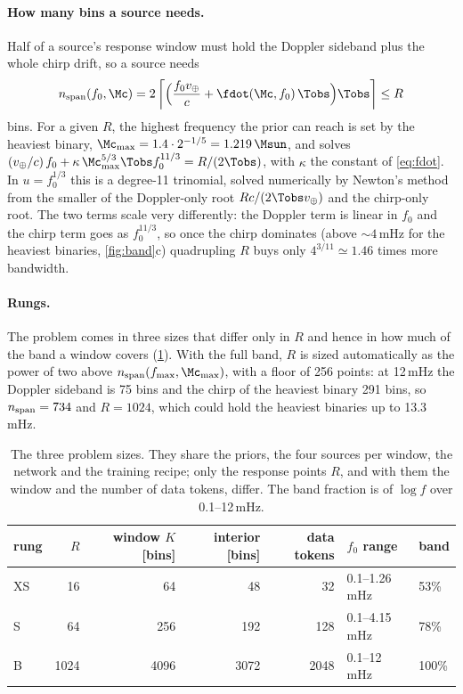 \paragraph{How many bins a source needs.}
Half of a source's response window must hold the Doppler sideband plus the whole chirp
drift, so a source needs
\begin{equation}
  n_{\rm span}(f_0,\Mc) = 2\left\lceil\Bigl(\frac{f_0 v_\oplus}{c}
  + \fdot(\Mc, f_0)\,\Tobs\Bigr)\Tobs\right\rceil \le R
  \label{eq:span}
\end{equation}
bins. For a given $R$, the highest frequency the prior can reach is set by the heaviest
binary, $\Mc_{\max} = 1.4\cdot2^{-1/5} = 1.219\,\Msun$, and solves
$(v_\oplus/c)\,f_0 + \kappa\,\Mc_{\max}^{5/3}\Tobs f_0^{11/3} = R/(2\Tobs)$, with
$\kappa$ the constant of \cref{eq:fdot}. In $u = f_0^{1/3}$ this
is a degree-11 trinomial, solved numerically by Newton's method from the smaller of the
Doppler-only root $Rc/(2\Tobs v_\oplus)$ and the chirp-only root. The two terms scale very
differently: the Doppler term is linear in $f_0$ and the chirp term goes as $f_0^{11/3}$, so
once the chirp dominates (above $\sim4$\,mHz for the heaviest binaries,
\cref{fig:band}c) quadrupling $R$ buys only $4^{3/11}\simeq1.46$ times more bandwidth.

\paragraph{Rungs.}
The problem comes in three sizes that differ only in $R$ and hence in how much of the band a
window covers (\cref{tab:rungs}). With the full band, $R$ is sized automatically as the
power of two above $n_{\rm span}(f_{\max},\Mc_{\max})$, with a floor of 256 points: at
12\,mHz the Doppler sideband is 75 bins and the chirp of the heaviest binary 291 bins, so
$n_{\rm span}=734$ and $R=1024$, which could hold the heaviest binaries up to 13.3\,mHz.

\begin{table}[h]
\caption{The three problem sizes. They share the priors, the four sources per window, the
network and the training recipe; only the response points $R$, and with them the window and
the number of data tokens, differ. The band fraction is of $\log f$ over 0.1--12\,mHz.}
\label{tab:rungs}
\centering
\small
\begin{tabular}{lrrrrll}
\toprule
rung & $R$ & window $K$ [bins] & interior [bins] & data tokens & $f_0$ range & band \\
\midrule
XS & 16 & 64 & 48 & 32 & 0.1--1.26\,mHz & 53\% \\
S & 64 & 256 & 192 & 128 & 0.1--4.15\,mHz & 78\% \\
B & 1024 & 4096 & 3072 & 2048 & 0.1--12\,mHz & 100\% \\
\bottomrule
\end{tabular}
\end{table}

